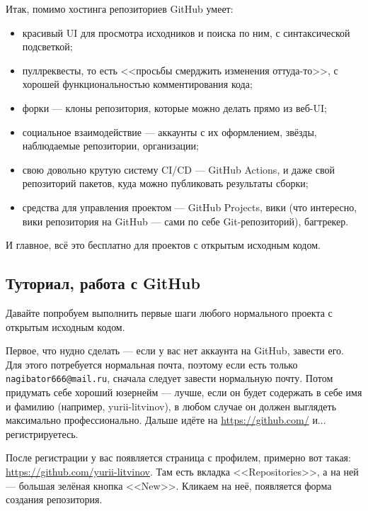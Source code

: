 \documentclass{../text-style}
\begin{document}
Итак, помимо хостинга репозиториев GitHub умеет:

\begin{itemize}
    \item красивый UI для просмотра исходников и поиска по ним, с синтаксической подсветкой;
    \item пуллреквесты, то есть <<просьбы смерджить изменения оттуда-то>>, с хорошей функциональностью комментирования кода;
    \item форки --- клоны репозитория, которые можно делать прямо из веб-UI;
    \item социальное взаимодействие --- аккаунты с их оформлением, звёзды, наблюдаемые репозитории, организации;
    \item свою довольно крутую систему CI/CD --- GitHub Actions, и даже свой репозиторий пакетов, куда можно публиковать результаты сборки;
    \item средства для управления проектом --- GitHub Projects, вики (что интересно, вики репозитория на GitHub --- сами по себе Git-репозиторий), багтрекер.
\end{itemize}

И главное, всё это бесплатно для проектов с открытым исходным кодом.

\subsection{Туториал, работа с GitHub}

Давайте попробуем выполнить первые шаги любого нормального проекта с открытым исходным кодом.

Первое, что нудно сделать --- если у вас нет аккаунта на GitHub, завести его. Для этого потребуется нормальная почта, поэтому если есть только \verb|nagibator666@mail.ru|, сначала следует завести нормальную почту. Потом придумать себе хороший юзернейм --- лучше, если он будет содержать в себе имя и фамилию (например, yurii-litvinov), в любом случае он должен выглядеть максимально профессионально. Дальше идёте на \url{https://github.com/} и... регистрируетесь.

После регистрации у вас появляется страница с профилем, примерно вот такая: \url{https://github.com/yurii-litvinov}. Там есть вкладка <<Repositories>>, а на ней --- большая зелёная кнопка <<New>>. Кликаем на неё, появляется форма создания репозитория.
\end{document}
